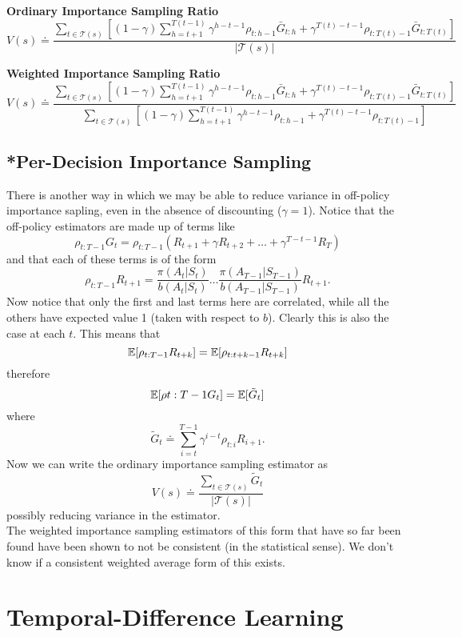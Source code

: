 {\bfseries{Ordinary Importance Sampling Ratio}}
\begin{equation}
    V(s) \doteq \frac{\sum_{t\in \mathcal{T}(s)} \left[ (1 - \gamma) \sum_{h=t+1}^{T(t-1)} \gamma^{h - t - 1}\rho_{t:h-1}\bar{G}_{t:h} + \gamma^{T(t) - t - 1}\rho_{t:T(t) - 1} \bar{G}_{t:T(t)} \right]}{|\mathcal{T}(s)|}
\end{equation}

{\bfseries{Weighted Importance Sampling Ratio}}
\begin{equation}
    V(s) \doteq \frac{\sum_{t\in \mathcal{T}(s)} \left[ (1 - \gamma) \sum_{h=t+1}^{T(t-1)} \gamma^{h - t - 1}\rho_{t:h-1}\bar{G}_{t:h} + \gamma^{T(t) - t - 1}\rho_{t:T(t) - 1} \bar{G}_{t:T(t)} \right]}{\sum_{t\in \mathcal{T}(s)} \left[ (1 - \gamma) \sum_{h=t+1}^{T(t-1)} \gamma^{h - t - 1}\rho_{t:h-1} + \gamma^{T(t) - t - 1}\rho_{t:T(t) - 1} \right]}
\end{equation}

\subsection{*Per-Decision Importance Sampling}
There is another way in which we may be able to reduce variance in off-policy importance sapling, even in the absence of discounting ($\gamma = 1$). Notice that the off-policy estimators are made up of terms like
\[
    \rho_{t:T-1}G_t = \rho_{t:T-1} (R_{t+1} + \gamma R_{t+2} + \dots+ \gamma^{T-t-1}R_{T})
\]
and that each of these terms is of the form
\[
    \rho_{t:T-1}R_{t+1} = \frac{\pi(A_t|S_t)}{b(A_t|S_t)}\dots\frac{\pi(A_{T-1}|S_{T-1})}{b(A_{T-1}|S_{T-1})}R_{t+1}.
\]
Now notice that only the first and last terms here are correlated, while all the others have expected value 1 (taken with respect to $b$). Clearly this is also the case at each $t$. This means that
\[
    \mathbb{E}{}[\rho_{t:T-1}R_{t+k}] = \mathbb{E}{}[\rho_{t:t+k-1}R_{t+k}]
\]
therefore
\[
    \mathbb{E}{}[\rho{t:T-1}G_t] = \mathbb{E}{}[\tilde{G}_t]
\]
where
\[
    \tilde{G}_t \doteq \sum_{i=t}^{T-1}\gamma^{i-t}\rho_{t:i}R_{i+1}.
\]
Now we can write the ordinary importance sampling estimator as
\[
    V(s) \doteq \frac{\sum_{t\in\mathcal{T}(s)} \tilde{G}_t}{|\mathcal{T}(s)|}
\]
possibly reducing variance in the estimator. \\

The weighted importance sampling estimators of this form that have so far been found have been shown to not be consistent (in the statistical sense). We don't know if a consistent weighted average form of this exists.

\clearpage
\section{Temporal-Difference Learning}
